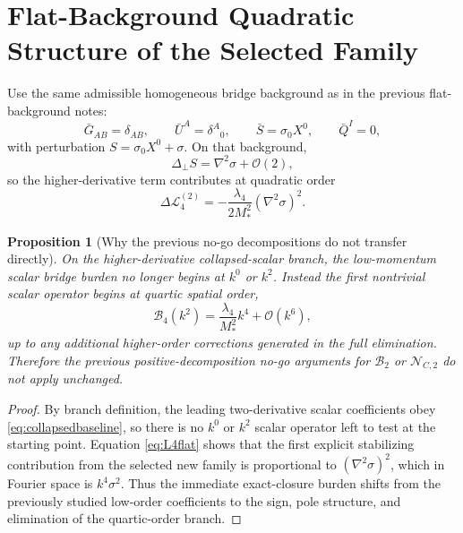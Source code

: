 \documentclass[11pt]{article}
\newtheorem{proposition}{Proposition}
\begin{document}
\section{Flat-Background Quadratic Structure of the Selected Family}

Use the same admissible homogeneous bridge background as in the previous flat-background notes:
\begin{equation}
\bar G_{AB}=\delta_{AB},
\qquad
\bar U^A=\delta^A{}_0,
\qquad
\bar S=\sigma_0X^0,
\qquad
\bar Q^I=0,
\label{eq:background}
\end{equation}
with perturbation \(S=\sigma_0X^0+\sigma\). On that background,
\begin{equation}
\Delta_{\perp}S
=
\nabla^2\sigma+\mathcal O(2),
\label{eq:Deltaperpflat}
\end{equation}
so the higher-derivative term contributes at quadratic order
\begin{equation}
\Delta\mathcal L_{4}^{(2)}
=
-\frac{\lambda_4}{2M_*^2}(\nabla^2\sigma)^2.
\label{eq:L4flat}
\end{equation}

\begin{proposition}[Why the previous no-go decompositions do not transfer directly]
On the higher-derivative collapsed-scalar branch, the low-momentum scalar bridge burden no longer begins at \(k^0\) or \(k^2\). Instead the first nontrivial scalar operator begins at quartic spatial order,
\begin{equation}
\mathcal B_{4}(k^2)
=
\frac{\lambda_4}{M_*^2}k^4+\mathcal O(k^6),
\label{eq:B4}
\end{equation}
up to any additional higher-order corrections generated in the full elimination. Therefore the previous positive-decomposition no-go arguments for \(\mathcal B_2\) or \(\mathcal N_{C,2}\) do not apply unchanged.
\end{proposition}

\begin{proof}
By branch definition, the leading two-derivative scalar coefficients obey \eqref{eq:collapsedbaseline}, so there is no \(k^0\) or \(k^2\) scalar operator left to test at the starting point. Equation \eqref{eq:L4flat} shows that the first explicit stabilizing contribution from the selected new family is proportional to \((\nabla^2\sigma)^2\), which in Fourier space is \(k^4\sigma^2\). Thus the immediate exact-closure burden shifts from the previously studied low-order coefficients to the sign, pole structure, and elimination of the quartic-order branch.
\end{proof}
\end{document}
